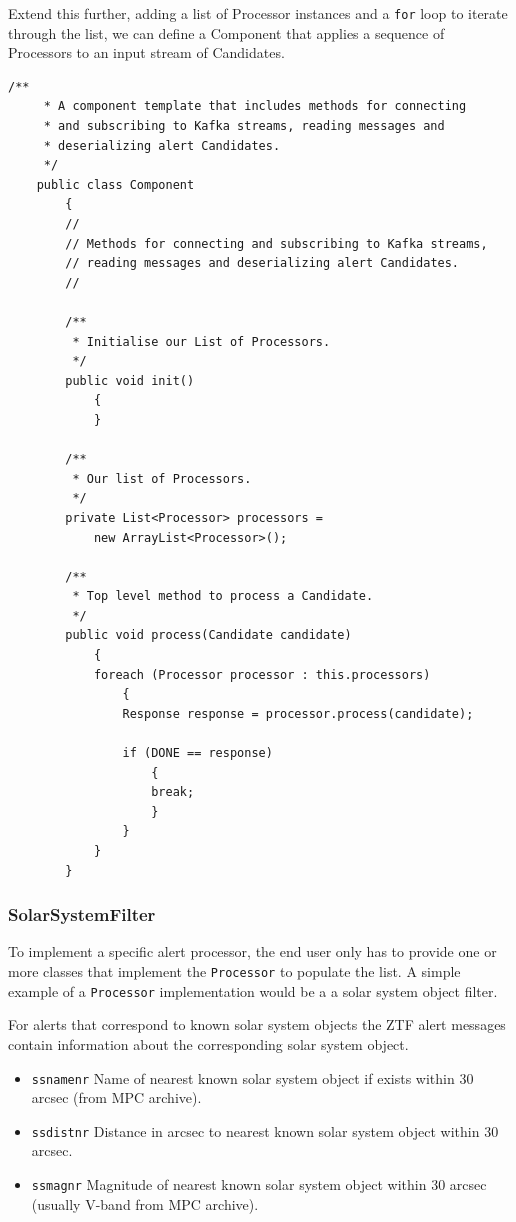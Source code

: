 \documentclass{article}
\newcommand{\ztf} {ZTF\xspace}
\newcommand{\javaname}[1] {{\ttfamily\color{codeblue} #1}}
\newcommand{\javaplural}[1] {\javaname{#1}s}
\begin{document}
Extend this further, adding a list of \javaname{Processor} instances and a \texttt{for} loop to iterate through the list, we can define a \javaname{Component} that applies a sequence of \javaplural{Processor} to an input stream of \javaplural{Candidate}.

 \begin{lstlisting}[style=Java]
    /**
     * A component template that includes methods for connecting
     * and subscribing to Kafka streams, reading messages and
     * deserializing alert Candidates.
     */
    public class Component
        {
        //
        // Methods for connecting and subscribing to Kafka streams,
        // reading messages and deserializing alert Candidates.
        //

        /**
         * Initialise our List of Processors.
         */
        public void init()
            {
            }

        /**
         * Our list of Processors.
         */
        private List<Processor> processors =
            new ArrayList<Processor>();

        /**
         * Top level method to process a Candidate.
         */
        public void process(Candidate candidate)
            {
            foreach (Processor processor : this.processors)
                {
                Response response = processor.process(candidate);

                if (DONE == response)
                    {
                    break;
                    }
                }
            }
        }
\end{lstlisting}

\subsubsection{SolarSystemFilter}
\label{java-interfaces.SolarSystemFilter}

To implement a specific alert processor, the end user only has to provide one or more classes that implement the \texttt{Processor} to populate the list. A simple example of a \texttt{Processor} implementation would be a a solar system object filter.

For alerts that correspond to known solar system objects the \ztf alert messages contain information about the corresponding solar system object.

\begin{itemize}
  \item \texttt{ssnamenr} Name of nearest known solar system object if exists within 30 arcsec (from MPC archive).
  \item \texttt{ssdistnr} Distance in arcsec to nearest known solar system object within 30 arcsec.
  \item \texttt{ssmagnr} Magnitude of nearest known solar system object within 30 arcsec (usually V-band from MPC archive).
\end{itemize}
\end{document}
